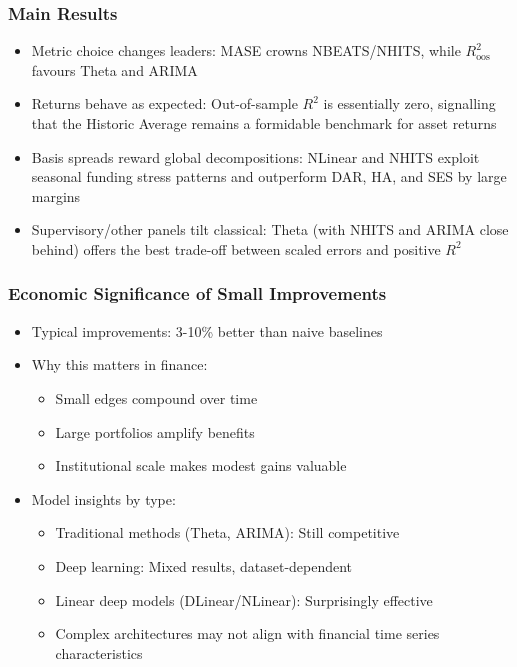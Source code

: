 \documentclass[ignorenonframetext, 9pt]{beamer}
\begin{document}
\begin{frame}
  \frametitle{Main Results}
  \begin{itemize}
  \item \alert{Metric choice changes leaders:} MASE crowns NBEATS/NHITS, while $R^2_{\text{oos}}$ favours Theta and ARIMA
  \vspace{0.3cm}
  \item \alert{Returns behave as expected:} Out-of-sample $R^2$ is essentially zero, signalling that the Historic Average remains a formidable benchmark for asset returns
  \vspace{0.3cm}
  \item \alert{Basis spreads reward global decompositions:} NLinear and NHITS exploit seasonal funding stress patterns and outperform DAR, HA, and SES by large margins
  \vspace{0.3cm}
  \item \alert{Supervisory/other panels tilt classical:} Theta (with NHITS and ARIMA close behind) offers the best trade-off between scaled errors and positive $R^2$
  \end{itemize}
\end{frame}

\begin{frame}
  \frametitle{Economic Significance of Small Improvements}
  \begin{itemize}
  \item Typical improvements: \alert{3-10\% better than naive baselines}
  \vspace{0.3cm}
  \item Why this matters in finance:
  \begin{itemize}
    \item Small edges compound over time
    \item Large portfolios amplify benefits
    \item Institutional scale makes modest gains valuable
  \end{itemize}
  \vspace{0.3cm}
  \item \alert{Model insights by type:}
  \begin{itemize}
    \item Traditional methods (Theta, ARIMA): Still competitive
    \item Deep learning: Mixed results, dataset-dependent
    \item Linear deep models (DLinear/NLinear): Surprisingly effective
    \item Complex architectures may not align with financial time series characteristics
  \end{itemize}
  \end{itemize}
\end{frame}
\end{document}
